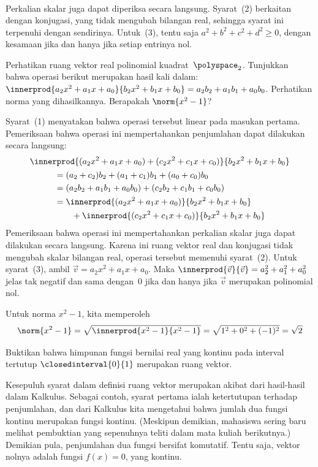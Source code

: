 \begin{exercises}
\begin{answer}
\begin{multline*}
\end{multline*}
Perkalian skalar juga dapat diperiksa secara langsung.
Syarat~(2) berkaitan dengan konjugasi, yang tidak mengubah bilangan real,
sehingga syarat ini terpenuhi dengan sendirinya.
Untuk~(3), tentu saja $a^2+b^2+c^2+d^2\geq 0$, dengan kesamaan jika dan hanya
jika setiap entrinya nol.
\end{answer}
%
\item Perhatikan ruang vektor real polinomial kuadrat~$\polyspace_2$.
Tunjukkan bahwa operasi berikut merupakan hasil kali dalam:
$\innerprod{a_2x^2+a_1x+a_0}{b_2x^2+b_1x+b_0}=a_2b_2+a_1b_1+a_0b_0$. 
Perhatikan norma yang dihasilkannya.
Berapakah $\norm{x^2-1}$?
\begin{answer}
Syarat~(1) menyatakan bahwa operasi tersebut linear pada masukan pertama.
Pemeriksaan bahwa operasi ini mempertahankan penjumlahan dapat dilakukan
secara langsung:
\begin{multline*}
  \innerprod{(a_2x^2+a_1x+a_0)+(c_2x^2+c_1x+c_0)}{b_2x^2+b_1x+b_0}  \\
  \begin{split}
    &=(a_2+c_2)b_2+(a_1+c_1)b_1+(a_0+c_0)b_0             \\
    &=(a_2b_2+a_1b_1+a_0b_0)+(c_2b_2+c_1b_1+c_0b_0)             \\
    &=\innerprod{(a_2x^2+a_1x+a_0)}{b_2x^2+b_1x+b_0}      \\
      &\qquad+\innerprod{(c_2x^2+c_1x+c_0)}{b_2x^2+b_1x+b_0}
  \end{split}
\end{multline*}
Pemeriksaan bahwa operasi ini mempertahankan perkalian skalar juga dapat
dilakukan secara langsung.
Karena ini ruang vektor real dan konjugasi tidak mengubah skalar bilangan real,
operasi tersebut memenuhi syarat~(2).
Untuk syarat~(3), ambil $\vec{v}=a_2x^2+a_1x+a_0$.
Maka $\innerprod{\vec{v}}{\vec{v}}=a_2^2+a_1^2+a_0^2$ jelas tak negatif dan
sama dengan~$0$ jika dan hanya jika $\vec{v}$ merupakan polinomial nol.

Untuk norma $x^2-1$, kita memperoleh
\begin{equation*} 
 \norm{x^2-1}=\sqrt{\innerprod{x^2-1}{x^2-1}}=\sqrt{1^2+0^2+(-1)^2}=\sqrt{2}
\end{equation*}
\end{answer}

\item Buktikan bahwa himpunan fungsi bernilai real yang kontinu pada interval
tertutup $\closedinterval{0}{1}$ merupakan ruang vektor.
\begin{answer}
Kesepuluh syarat dalam definisi ruang vektor merupakan akibat dari
hasil-hasil dalam Kalkulus.
Sebagai contoh, syarat pertama ialah ketertutupan terhadap penjumlahan, dan
dari Kalkulus kita mengetahui bahwa jumlah dua fungsi kontinu merupakan fungsi
kontinu.
(Meskipun demikian, mahasiswa sering baru melihat pembuktian yang sepenuhnya
teliti dalam mata kuliah berikutnya.)
Demikian pula, penjumlahan dua fungsi bersifat komutatif.
Tentu saja, vektor nolnya adalah fungsi $f(x)=0$, yang kontinu.
\end{answer}


\end{exercises}
